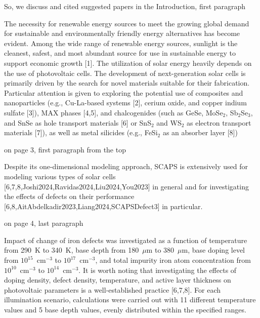 \documentclass[a4paper,fleqn]{cas-sc}
\begin{document}
So, we discuss and cited suggested papers in the Introduction, first paragraph

\begin{mdframed}
The necessity for renewable energy sources to meet the growing global demand for sustainable and environmentally friendly energy alternatives has become evident.
Among the wide range of renewable energy sources, sunlight is the cleanest, safest,
and most abundant source for use in sustainable energy to support economic growth [1].
The utilization of solar energy heavily depends on the use of photovoltaic cells.
\textcolor[rgb]{1.00,0.07,0.00}{
The development of next-generation solar cells is primarily driven by the search for novel materials suitable for their fabrication.
Particular attention is given to exploring the potential use of composites and nanoparticles
(e.g., Cu-La-based systems [2], cerium oxide, and copper indium sulfate [3]),
MAX phases [4,5],
and chalcogenides (such as GeSe, MoSe$_2$, Sb$_2$Se$_3$, and SnSe as hole transport materials [6]
or SnS$_2$ and WS$_2$ as electron transport materials [7]),
as well as metal silicides (e.g., FeSi$_2$ as an absorber layer [8])}
\end{mdframed}

on page 3, first paragraph from the top


\begin{mdframed}
Despite its one-dimensional modeling approach, SCAPS is extensively used for modeling various types
of solar cells [\textcolor[rgb]{1.00,0.07,0.00}{6,7,8},Joshi2024,Ravidas2024,Liu2024,You2023] in general
and for investigating the effects of defects on their performance [\textcolor[rgb]{1.00,0.07,0.00}{6,8,}AitAbdelkadir2023,Liang2024,SCAPSDefect3] in particular.
\end{mdframed}


on page 4, last paragraph

\begin{mdframed}
Impact of change of iron defects was investigated as a function of temperature from 290~K to 340~K,
base depth from 180~$\mu$m to 380~$\mu$m,
base doping level from $10^{15}$~cm$^{-3}$ to $10^{17}$~cm$^{-3}$,
and total impurity iron atom concentration from $10^{10}$~cm$^{-3}$ to $10^{14}$~cm$^{-3}$.
\textcolor[rgb]{1.00,0.07,0.00}{It is worth noting that investigating the effects of doping density, defect density, temperature, and active layer thickness on photovoltaic parameters is a well-established practice [6,7,8].}
For each illumination scenario, calculations were carried out with 11 different temperature values and 5 base depth values,
evenly distributed within the specified ranges.
\end{mdframed}
\end{document}
